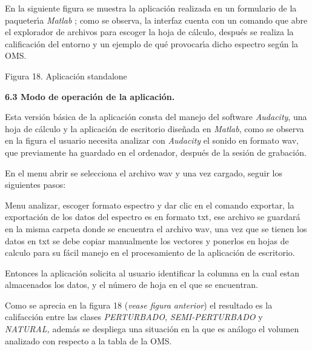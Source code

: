 En la siguiente figura se muestra la aplicaci\'{o}n realizada en un
formulario de la paqueter\'{\i}a \textit{Matlab }; como se observa, la
interfaz cuenta con un comando que abre el explorador de archivos para
escoger la hoja de c\'{a}lculo, despu\'{e}s se realiza la calificaci\'{o}n
del entorno y un ejemplo de qu\'{e} provocar\'{\i}a dicho espectro seg\'{u}n
la OMS.

\begin{center}
\qquad \qquad {}

\qquad \qquad Figura 18. Aplicaci\'{o}n standalone
\end{center}

\textbf{6.3 Modo de operaci\'{o}n de la aplicaci\'{o}n.}

Esta versi\'{o}n b\'{a}sica de la aplicaci\'{o}n consta del manejo del
software \textit{Audacity}, una hoja de c\'{a}lculo y la aplicaci\'{o}n de
escritorio dise\~{n}ada en \textit{Matlab}, como se observa en la figura el
usuario necesita analizar con \textit{Audacity} el sonido en formato wav,
que previamente ha guardado en el ordenador, despu\'{e}s de la sesi\'{o}n de
grabaci\'{o}n.

En el menu abrir se selecciona el archivo wav y una vez cargado, seguir los
siguientes pasos:

Menu analizar, escoger formato espectro y dar clic en el comando exportar,
la exportaci\'{o}n de los datos del espectro es en formato txt, ese archivo
se guardar\'{a} en la misma carpeta donde se encuentra el archivo wav, una
vez que se tienen los datos en txt se debe copiar manualmente los vectores y
ponerlos en hojas de calculo para su f\'{a}cil manejo en el procesamiento de
la aplicaci\'{o}n de escritorio.

Entonces la aplicaci\'{o}n solicita al usuario identificar la columna en la
cual estan almacenados los datos, y el n\'{u}mero de hoja en el que se
encuentran.

Como se aprecia en la figura 18 (\textit{vease figura anterior}) el
resultado es la califacci\'{o}n entre las clases \textit{PERTURBADO,}
\textit{SEMI-PERTURBADO} y \textit{NATURAL, }adem\'{a}s se despliega una
situaci\'{o}n en la que es an\'{a}logo el volumen analizado con respecto a
la tabla de la OMS.

